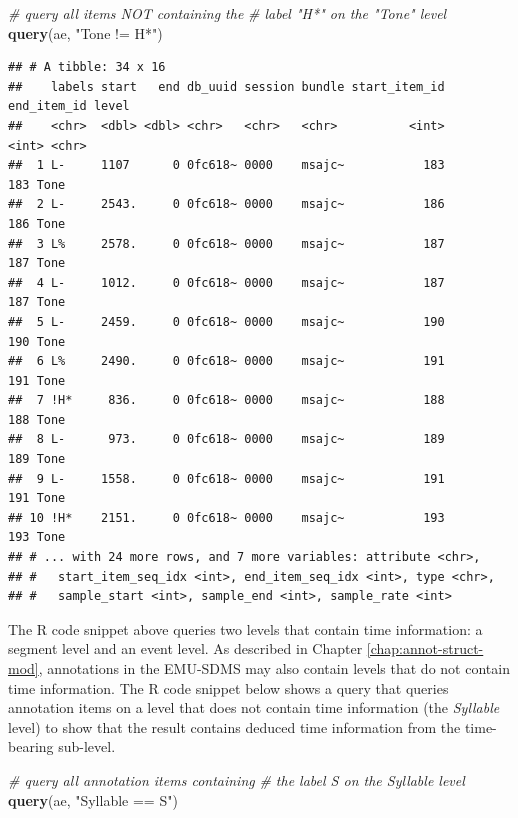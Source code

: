 \documentclass[]{book}
\newenvironment{Shaded}{\begin{snugshade}}{\end{snugshade}}
\newcommand{\CommentTok}[1]{\textcolor[rgb]{0.56,0.35,0.01}{\textit{#1}}}
\newcommand{\KeywordTok}[1]{\textcolor[rgb]{0.13,0.29,0.53}{\textbf{#1}}}
\newcommand{\NormalTok}[1]{#1}
\newcommand{\StringTok}[1]{\textcolor[rgb]{0.31,0.60,0.02}{#1}}
\begin{document}
\begin{Shaded}
\begin{Highlighting}[]
\CommentTok{# query all items NOT containing the}
\CommentTok{# label "H*" on the "Tone" level}
\KeywordTok{query}\NormalTok{(ae, }\StringTok{"Tone != H*"}\NormalTok{)}
\end{Highlighting}
\end{Shaded}

\begin{verbatim}
## # A tibble: 34 x 16
##    labels start   end db_uuid session bundle start_item_id end_item_id level
##    <chr>  <dbl> <dbl> <chr>   <chr>   <chr>          <int>       <int> <chr>
##  1 L-     1107      0 0fc618~ 0000    msajc~           183         183 Tone 
##  2 L-     2543.     0 0fc618~ 0000    msajc~           186         186 Tone 
##  3 L%     2578.     0 0fc618~ 0000    msajc~           187         187 Tone 
##  4 L-     1012.     0 0fc618~ 0000    msajc~           187         187 Tone 
##  5 L-     2459.     0 0fc618~ 0000    msajc~           190         190 Tone 
##  6 L%     2490.     0 0fc618~ 0000    msajc~           191         191 Tone 
##  7 !H*     836.     0 0fc618~ 0000    msajc~           188         188 Tone 
##  8 L-      973.     0 0fc618~ 0000    msajc~           189         189 Tone 
##  9 L-     1558.     0 0fc618~ 0000    msajc~           191         191 Tone 
## 10 !H*    2151.     0 0fc618~ 0000    msajc~           193         193 Tone 
## # ... with 24 more rows, and 7 more variables: attribute <chr>,
## #   start_item_seq_idx <int>, end_item_seq_idx <int>, type <chr>,
## #   sample_start <int>, sample_end <int>, sample_rate <int>
\end{verbatim}

The R code snippet above queries two levels that contain time information: a segment level and an event level. As described in Chapter \ref{chap:annot-struct-mod}, annotations in the EMU-SDMS may also contain levels that do not contain time information. The R code snippet below shows a query that queries annotation items on a level that does not contain time information (the \emph{Syllable} level) to show that the result contains deduced time information from the time-bearing sub-level.

\begin{Shaded}
\begin{Highlighting}[]
\CommentTok{# query all annotation items containing}
\CommentTok{# the label S on the Syllable level}
\KeywordTok{query}\NormalTok{(ae, }\StringTok{"Syllable == S"}\NormalTok{)}
\end{Highlighting}
\end{Shaded}
\end{document}
